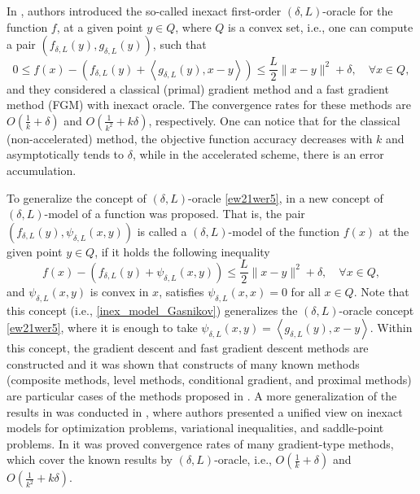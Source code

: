 \documentclass[11pt]{amsart}
\theoremstyle{definition}
\numberwithin{equation}{section}
\begin{document}
In \cite{Devolder2013smooth}, authors introduced the so-called inexact first-order $(\delta, L)$-oracle for the function $f$, at a given point $y \in Q$, where $Q$ is a convex set, i.e., one can compute a pair $(f_{\delta, L}(y), g_{\delta, L}(y))$, such that
\begin{equation}\label{ew21wer5}
    0 \leq f(x)-\left(f_{\delta, L}(y)+\left\langle g_{\delta, L}(y), x-y\right\rangle\right) \leq \frac{L}{2}\|x-y\|^2+\delta,  \quad \forall x \in Q, 
\end{equation}
and they considered a classical (primal) gradient method and a fast gradient method (FGM) with inexact oracle. The convergence rates for these methods are $O\left(\frac{1}{k} + \delta\right)$ and $O\left(\frac{1}{k^2} + k \delta\right)$, respectively. One can notice that for the classical (non-accelerated) method, the objective function accuracy decreases with $k$ and asymptotically tends to $\delta$, while in the accelerated scheme, there is an error accumulation.

To generalize the concept of $(\delta, L)$-oracle \eqref{ew21wer5}, in \cite{Gasnikov2019fast} a new concept of $(\delta, L)$-model of a function was proposed. That is, the pair $(f_{\delta, L} (y), \psi_{\delta, L} (x, y))$ is called a $(\delta, L)$-model of the function $f(x)$ at the given point $y \in Q$, if it holds the following inequality
\begin{equation}\label{inex_model_Gasnikov}
    f(x) - \left( f_{\delta, L} (y) + \psi_{\delta, L} (x, y)\right) \leq \frac{L}{2} \|x - y\|^2 + \delta, \quad \forall x \in Q,
\end{equation}
and $\psi_{\delta, L} (x, y)$  is convex in $x$, satisfies $\psi_{\delta, L}(x,x) = 0$  for all $x \in Q$. Note that this concept (i.e., \eqref{inex_model_Gasnikov}) generalizes the $(\delta, L)$-oracle concept \eqref{ew21wer5}, where it is enough to take $\psi_{\delta, L} (x, y) = \left\langle g_{\delta, L}(y), x-y\right\rangle.$ Within this concept, the gradient descent and fast gradient descent methods are constructed and it was shown that constructs of many known methods (composite methods, level methods, conditional gradient, and proximal methods) are particular cases of the methods proposed in \cite{Gasnikov2019fast}. A more generalization of the results in \cite{Gasnikov2019fast} was conducted in \cite{Stonyakin2021OMS}, where authors presented a unified view on inexact models for optimization problems, variational inequalities, and saddle-point problems. In \cite{Gasnikov2019fast,Stonyakin2021OMS} it was proved convergence rates of many gradient-type methods, which cover the known results by $(\delta, L)$-oracle, i.e., $O\left(\frac{1}{k} + \delta\right)$ and $O\left(\frac{1}{k^2} + k \delta\right)$. 
\end{document}
